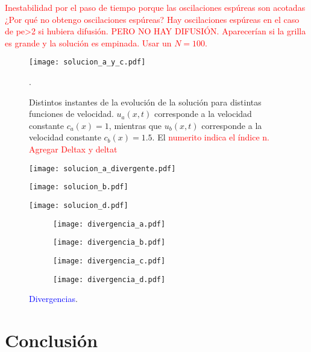 \documentclass[aps,prb,twocolumn,superscriptaddress,floatfix,longbibliography,10pt]{revtex4-2}
\newcounter{para}
\begin{document}
\textcolor{red}{Inestabilidad por el paso de tiempo porque las oscilaciones espúreas son acotadas ¿Por qué no obtengo oscilaciones espúreas? Hay oscilaciones espúreas en el caso de pe>2 si hubiera difusión. PERO NO HAY DIFUSIÓN. Aparecerían si la grilla es grande y la solución es empinada. Usar un $N = 100$.}

\begin{figure}[h]
  \texttt{[image: solucion\_a\_y\_c.pdf]}
  \caption{Distintos instantes de la evolución de la solución para distintas funciones de velocidad. $u_a(x,t)$ corresponde a la velocidad constante $c_a(x) = 1$, mientras que $u_b(x,t)$ corresponde a la velocidad constante $c_b(x) = 1.5$. El \textcolor{red}{numerito indica el índice n. Agregar Deltax y deltat}}. 
   \label{fig:solucion_a_y_c}
\end{figure}

\begin{figure}[h]
  \texttt{[image: solucion\_a\_divergente.pdf]}
  \caption{}
   \label{fig:solucion_a_divergente}
\end{figure}

\begin{figure}[h]
  \texttt{[image: solucion\_b.pdf]}
  \caption{}
   \label{fig:solucion_b}
\end{figure}

\begin{figure}[h]
  \texttt{[image: solucion\_d.pdf]}
  \caption{}
   \label{fig:solucion_d}
\end{figure}


\onecolumngrid

\begin{figure}
  \centering
  \begin{subfigure}[b]{0.45\textwidth}
      \centering
      \texttt{[image: divergencia\_a.pdf]}
      \caption{\label{fig:divergencia_a}}
  \end{subfigure}
  \hfill
  \begin{subfigure}[b]{0.45\textwidth}
      \centering
      \texttt{[image: divergencia\_b.pdf]}
      \caption{\label{fig:divergencia_b}}
  \end{subfigure}
  \hfill
  \begin{subfigure}[b]{0.45\textwidth}
      \centering
      \texttt{[image: divergencia\_c.pdf]}
      \caption{\label{fig:divergencia_c}}
  \end{subfigure}
  \hfill
  \begin{subfigure}[b]{0.45\textwidth}
      \centering
      \texttt{[image: divergencia\_d.pdf]}
      \caption{\label{fig:divergencia_d}}
  \end{subfigure}
     \caption{\textcolor{blue}{Divergencias}.}
     \label{fig:simple_error_vs_h}
\end{figure}

\twocolumngrid


\section{Conclusión}




\end{document}

